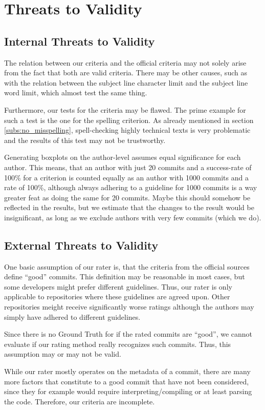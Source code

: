 \section{Threats to Validity}
\label{sec:threats-to-validity}
%


\subsection{Internal Threats to Validity}
\label{sec:internal-threats}

The relation between our criteria and the official criteria may not solely arise from the fact that both are valid criteria. There may be other causes, such as with the relation between the subject line character limit and the subject line word limit, which almost test the same thing.

Furthermore, our tests for the criteria may be flawed. The prime example for such a test is the one for the spelling criterion. As already mentioned in section \ref{subs:no_misspelling}, spell-checking highly technical texts is very problematic and the results of this test may not be trustworthy.

Generating boxplots on the author-level assumes equal significance for each author. This means, that an author with just 20 commits and a success-rate of 100\% for a criterion is counted equally as an author with 1000 commits and a rate of 100\%, although always adhering to a guideline for 1000 commits is a way greater feat as doing the same for 20 commits. Maybe this should somehow be reflected in the results, but we estimate that the changes to the result would be insignificant, as long as we exclude authors with very few commits (which we do).

\subsection{External Threats to Validity}
\label{sec:external-threats}

One basic assumption of our rater is, that the criteria from the official sources define ``good'' commits. This definition may be reasonable in most cases, but some developers might prefer different guidelines. Thus, our rater is only applicable to repositories where these guidelines are agreed upon. Other repositories meight receive significantly worse ratings although the authors may simply have adhered to different guidelines.

Since there is no Ground Truth for if the rated commits are ``good'', we cannot evaluate if our rating method really recognizes such commits. Thus, this assumption may or may not be valid.

While our rater mostly operates on the metadata of a commit, there are many more factors that constitute to a good commit that have not been considered, since they for example would require interpreting/compiling or at least parsing the code. Therefore, our criteria are incomplete.
